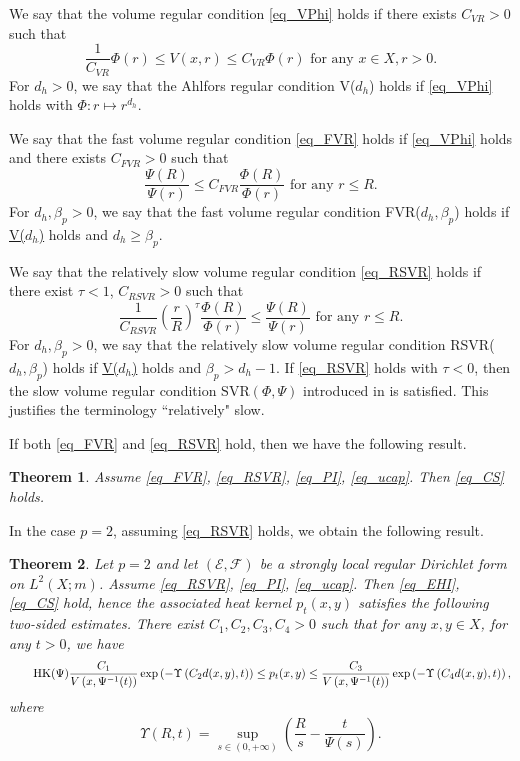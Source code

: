 \documentclass[11pt,a4paper]{article}
\numberwithin{equation}{section}
\theoremstyle{plain}
\newtheorem{theorem}{Theorem}[section]
\theoremstyle{definition}
\begin{document}
We say that the volume regular condition \ref{eq_VPhi} holds if there exists $C_{VR}>0$ such that
\begin{equation*}\label{eq_VPhi}\tag*{V($\Phi$)}
\frac{1}{C_{VR}}\Phi(r)\le V(x,r)\le C_{VR}\Phi(r)\text{ for any }x\in X,r>0.
\end{equation*}
For $d_h>0$, we say that the Ahlfors regular condition \hypertarget{eq_Vdh}{V($d_h$)} holds if \ref{eq_VPhi} holds with $\Phi:r\mapsto r^{d_h}$.

We say that the fast volume regular condition \ref{eq_FVR} holds if \ref{eq_VPhi} holds and there exists $C_{FVR}>0$ such that
\begin{equation*}\label{eq_FVR}\tag*{FVR($\Phi,\Psi$)}
\frac{\Psi(R)}{\Psi(r)}\le C_{FVR}\frac{\Phi(R)}{\Phi(r)}\text{ for any }r\le R.
\end{equation*}
For $d_h,\beta_p>0$, we say that the fast volume regular condition \hypertarget{eq_FVRdb}{FVR($d_h,\beta_p$)} holds if \hyperlink{eq_Vdh}{V($d_h$)} holds and $d_h\ge\beta_p$.

We say that the relatively slow volume regular condition \ref{eq_RSVR} holds if there exist $\tau<1$, $C_{RSVR}>0$ such that
\begin{equation*}\label{eq_RSVR}\tag*{RSVR($\Phi,\Psi$)}
\frac{1}{C_{RSVR}}\left(\frac{r}{R}\right)^{\tau}\frac{\Phi(R)}{\Phi(r)}\le \frac{\Psi(R)}{\Psi(r)}\text{ for any }r\le R.
\end{equation*}
For $d_h,\beta_p>0$, we say that the relatively slow volume regular condition \hypertarget{eq_RSVRdb}{RSVR($d_h,\beta_p$)} holds if \hyperlink{eq_Vdh}{V($d_h$)} holds and $\beta_p>d_h-1$. If \ref{eq_RSVR} holds with $\tau<0$, then the slow volume regular condition $\mathrm{SVR}(\Phi,\Psi)$ introduced in \cite{Yan25c} is satisfied. This justifies the terminology ``relatively" slow.

If both \ref{eq_FVR} and \ref{eq_RSVR} hold, then we have the following result.

\begin{theorem}\label{thm_main_RSVR}
Assume \ref{eq_FVR}, \ref{eq_RSVR}, \ref{eq_PI}, \ref{eq_ucap}. Then \ref{eq_CS} holds.
\end{theorem}

In the case $p=2$, assuming \ref{eq_RSVR} holds, we obtain the following result.

\begin{theorem}\label{thm_HK}
Let $p=2$ and let $(\mathcal{E},\mathcal{F})$ be a strongly local regular Dirichlet form on $L^2(X;m)$. Assume \ref{eq_RSVR}, \ref{eq_PI}, \ref{eq_ucap}. Then \ref{eq_EHI}, \ref{eq_CS} hold, hence the associated heat kernel $p_t(x,y)$ satisfies the following two-sided estimates. There exist $C_1,C_2,C_3,C_4>0$ such that for any $x,y\in X$, for any $t>0$, we have
\begin{equation*}\label{eq_HK}\tag*{\text{HK}($\Psi$)}
\frac{C_1}{V\left(x,\Psi^{-1}(t)\right)}\exp\left(-\Upsilon\left(C_2d(x,y),t\right)\right)\le p_t(x,y)\le\frac{C_3}{V\left(x,\Psi^{-1}(t)\right)}\exp\left(-\Upsilon\left(C_4d(x,y),t\right)\right),
\end{equation*}
where
$$\Upsilon(R,t)=\sup_{s\in(0,+\infty)}\left(\frac{R}{s}-\frac{t}{\Psi(s)}\right).$$
\end{theorem}
\end{document}
